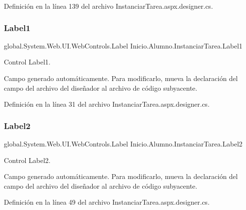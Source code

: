 Definición en la línea 139 del archivo Instanciar\+Tarea.\+aspx.\+designer.\+cs.

\mbox{\label{classInicio_1_1Alumno_1_1InstanciarTarea_a7cec989b595682dc3e86dcf9d66bb85a}} 
\subsubsection{\texorpdfstring{Label1}{Label1}}
{\footnotesize\ttfamily global.\+System.\+Web.\+U\+I.\+Web\+Controls.\+Label Inicio.\+Alumno.\+Instanciar\+Tarea.\+Label1\hspace{0.3cm}{\ttfamily [protected]}}



Control Label1. 

Campo generado automáticamente. Para modificarlo, mueva la declaración del campo del archivo del diseñador al archivo de código subyacente. 

Definición en la línea 31 del archivo Instanciar\+Tarea.\+aspx.\+designer.\+cs.

\mbox{\label{classInicio_1_1Alumno_1_1InstanciarTarea_a378777bb096371da6b8e9491d177413d}} 
\subsubsection{\texorpdfstring{Label2}{Label2}}
{\footnotesize\ttfamily global.\+System.\+Web.\+U\+I.\+Web\+Controls.\+Label Inicio.\+Alumno.\+Instanciar\+Tarea.\+Label2\hspace{0.3cm}{\ttfamily [protected]}}



Control Label2. 

Campo generado automáticamente. Para modificarlo, mueva la declaración del campo del archivo del diseñador al archivo de código subyacente. 

Definición en la línea 49 del archivo Instanciar\+Tarea.\+aspx.\+designer.\+cs.

\mbox{\label{classInicio_1_1Alumno_1_1InstanciarTarea_afcd4d40d67e11759334a9f8bcf74815a}} 
